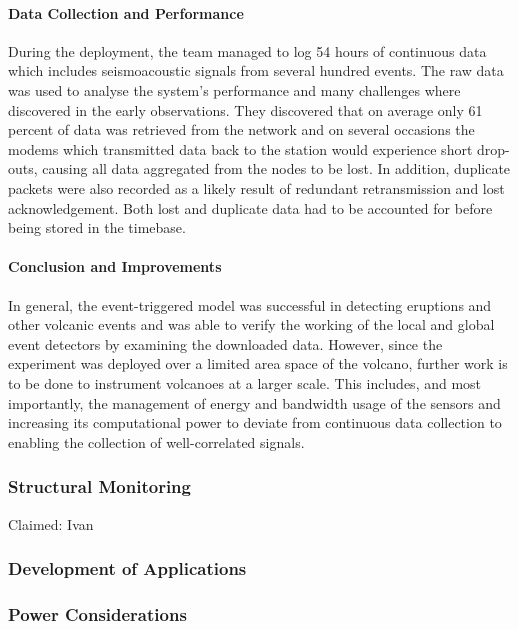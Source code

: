 \paragraph{Data Collection and Performance}

During the deployment, the team managed to log 54 hours of continuous data which includes seismoacoustic signals from several hundred events. The raw data was used to analyse the system's performance and many challenges where discovered in the early observations. They discovered that on average only 61 percent of data was retrieved from the network and on several occasions the modems which transmitted data back to the station would experience short drop-outs, causing all data aggregated from the nodes to be lost. In addition, duplicate packets were also recorded as a likely result of redundant retransmission and lost acknowledgement. Both lost and duplicate data had to be accounted for before being stored in the timebase.

\paragraph{Conclusion and Improvements}

In general, the event-triggered model was successful in detecting eruptions and other volcanic events and was able to verify the working of the local and global event detectors by examining the downloaded data. However, since the experiment was deployed over a limited area space of the volcano, further work is to be done to instrument volcanoes at a larger scale. This includes, and most importantly, the management of energy and bandwidth usage of the sensors and increasing its computational power to deviate from continuous data collection to enabling the collection of well-correlated signals. 

\subsubsection*{Structural Monitoring}
\cite{5508230} Claimed: Ivan


\subsubsection*{Development of Applications}
\cite{Fagerstrom:1988:DTD:55823.55833}


\subsubsection*{Power Considerations}



